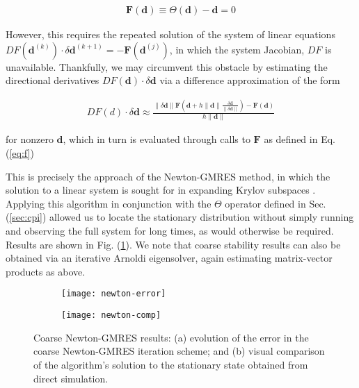   \begin{align}
    \label{eq:f}
    \mathbf{F}(\mathbf{d}) \equiv \Theta(\mathbf{d}) - \mathbf{d} = 0
  \end{align}

  However, this requires the repeated solution of the system of linear
  equations
  $DF(\mathbf{d}^{(k)}) \cdot \delta \mathbf{d}^{(k+1)} =
  -\mathbf{F}(\mathbf{d}^{(j)})$, in which the system Jacobian, $DF$
  is unavailable.
  Thankfully, we may circumvent this obstacle by estimating the
  directional derivatives $DF(\mathbf{d}) \cdot \delta \mathbf{d}$ via
  a difference approximation of the form

  \begin{align}
    DF(d) \cdot \delta \mathbf{d} \approx \frac{\| \delta \mathbf{d} \| \mathbf{F}(\mathbf{d} + h \| \mathbf{d} \| \frac{\delta \mathbf{d}}{\| \delta \mathbf{d} \|}) - \mathbf{F}(\mathbf{d})}{h \| \mathbf{d} \|}
  \end{align}

  \noindent for nonzero $\mathbf{d}$, which in turn is evaluated
  through calls to $\mathbf{F}$ as defined in Eq. (\ref{eq:f})

  This is precisely the approach of the Newton-GMRES method, in which
  the solution to a linear system is sought for in expanding Krylov
  subspaces \cite{kelley_solving_2003}.
  Applying this algorithm in conjunction with the $\Theta$ operator
  defined in Sec. (\ref{sec:cpi}) allowed us to locate the stationary
  distribution without simply running and observing the full system
  for long times, as would otherwise be required.
  Results are shown in Fig. (\ref{fig:newton-results}).
  We note that coarse stability results can also be obtained via an
  iterative Arnoldi eigensolver, again estimating matrix-vector
  products as above.

  \begin{figure}
    \vspace{-5mm} \centering
    \begin{subfigure}{0.49\textwidth}
      \centering
      \texttt{[image: newton-error]}
      \subcaption{\label{fig:newton-error}}
    \end{subfigure} %
    \begin{subfigure}{0.49\textwidth}
      \centering
      \texttt{[image: newton-comp]}
      \subcaption{\label{fig:newton-comp}}
    \end{subfigure}%
    \caption[Coarse Newton-GMRES results]{Coarse Newton-GMRES results:
      (a) evolution of the error in the coarse Newton-GMRES iteration
      scheme; and (b) visual comparison of the algorithm's solution to
      the stationary state obtained from direct
      simulation. \label{fig:newton-results}}
  \end{figure}


